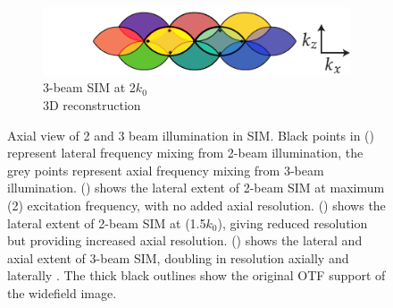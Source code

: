 \begin{figure}
\begin{subfigure}[b]{0.48\textwidth}
        \includegraphics{./sim/axial_3_beam}
        \caption{3-beam SIM at \SI{2}{\times}$k_0$\\3D reconstruction}
        \label{fig:sim_axial_3_beam}
    \end{subfigure}
    \caption{
    Axial view of 2 and 3 beam illumination in SIM.
    Black points in () represent lateral frequency mixing from 2-beam illumination, the grey points represent axial frequency mixing from 3-beam illumination.
    () shows the lateral extent of 2-beam SIM at maximum (\SI{2}{\times}) excitation frequency, with no added axial resolution.
    () shows the lateral extent of 2-beam SIM at (\SI{1.5}{\times}$k_0$), giving reduced resolution but providing increased axial resolution.
     () shows the lateral and axial extent of 3-beam SIM, doubling in resolution axially and laterally \cite{gustasson}.
     The thick black outlines show the original OTF support of the widefield image.    %
    }
    \label{fig:sim_axial}
\end{figure}




